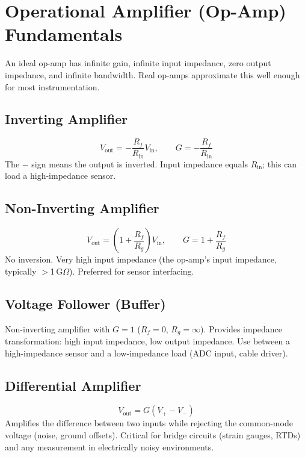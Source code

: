 \documentclass[11pt,letterpaper,twoside,openany]{book}
\begin{document}
\section{Operational Amplifier (Op-Amp) Fundamentals}
An ideal op-amp has infinite gain, infinite input impedance, zero output impedance, and infinite bandwidth. Real op-amps approximate this well enough for most instrumentation.

\subsection{Inverting Amplifier}
\begin{equation}
V_{\text{out}} = -\frac{R_f}{R_{\text{in}}} V_{\text{in}}, \qquad G = -\frac{R_f}{R_{\text{in}}}
\end{equation}
The $-$ sign means the output is inverted. Input impedance equals $R_{\text{in}}$; this can load a high-impedance sensor.

\subsection{Non-Inverting Amplifier}
\begin{equation}
V_{\text{out}} = \left(1 + \frac{R_f}{R_g}\right) V_{\text{in}}, \qquad G = 1 + \frac{R_f}{R_g}
\end{equation}
No inversion. Very high input impedance (the op-amp's input impedance, typically $>$1\,G$\Omega$). Preferred for sensor interfacing.

\subsection{Voltage Follower (Buffer)}
Non-inverting amplifier with $G = 1$ ($R_f = 0$, $R_g = \infty$). Provides impedance transformation: high input impedance, low output impedance. Use between a high-impedance sensor and a low-impedance load (ADC input, cable driver).

\subsection{Differential Amplifier}
\begin{equation}
V_{\text{out}} = G (V_+ - V_-)
\end{equation}
Amplifies the difference between two inputs while rejecting the common-mode voltage (noise, ground offsets). Critical for bridge circuits (strain gauges, RTDs) and any measurement in electrically noisy environments.
\end{document}

